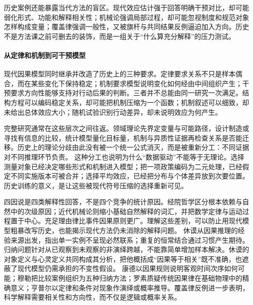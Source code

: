 历史案例还能暴露当代方法的盲区。现代效应估计强于回答明确干预对比，却可能弱化形式、功能和解释相关性；机械论强调局部过程，却可能忽视制度和规范对象怎样构成变量；覆盖律强调一般性，又被旗杆与共同结果反例逼迫加入方向。历史不是方法课之前可删去的装饰，而是一组关于“什么算充分解释”的压力测试。

\paragraph{从定律和机制到可干预模型}

现代因果模型同时继承并改造了历史上的三种要求。定律要求关系不只是样本偶合，而在某些变化下保持稳定；机制要求模型说明变化如何经由中间组织产生；干预要求方向性能够支持对行动后果的判断。三者并不总能由同一研究一次满足。结构方程可以编码稳定关系，却可能把机制压缩为一个函数；机制叙述可以细致，却未给出总体效应大小；随机试验识别行动差异，却未说明效应为何产生。

完整研究通常在这些层次之间往返。领域理论先界定变量与可能路径，设计制造或寻找有信息的比较，统计模型量化目标量，机制与异质性证据再检查关系是否能迁移。历史上的理论分歧由此没有被一个统一公式消灭，而是被重新分工：不同证据对不同推理环节负责。
这种分工也说明为什么“数据驱动”不能等于无理论。选择测量对象已经决定哪些形式和机制进入模型；把一项政策编码为二元处理，已经假定不同实施版本可被合并；选择平均效应，已经把分布与个体差异放到次要位置。历史训练的意义，是让这些被现代符号压缩的选择重新可见。

\begin{chapterreview}
四因说是四类解释性回答，不是四个竞争的统计原因。经院哲学区分根本依赖与自然中的次级原因；近代机械论则缩小基础自然解释的词汇，并把数学定律与运动过程置于中心。充足理由律比事件因果原则更广。理解这些差别，可以防止用现代模型粗暴改写历史，也能揭示现代方法仍未消除的解释问题。 休谟从因果推理的经验来源出发，指出单一实例不呈现必然联系；重复的恒常结合通过习惯产生期待。归纳问题针对从已观察到未观察的非演绎跨越，不能靠简单增加样本解决。休谟的对象定义与心灵定义共同构成其分析，把他概括成“因果等于相关”既不准确，也遮蔽了现代模型仍需承担的不变性假设。 康德以因果规则说明客观时间次序如何可能；穆勒把比较案例组织为五种归纳方法；罗素质疑传统因果律在基础物理中的精确意义；亨普尔以定律和条件对现象作演绎或概率推导。覆盖律反例进一步表明，科学解释需要相关性和方向性，而不仅是逻辑或概率关系。
\end{chapterreview}

